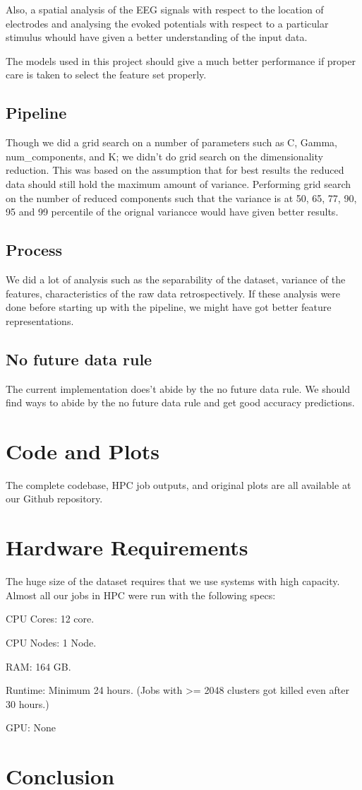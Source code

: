 \documentclass[final,leqno,onefignum,onetabnum]{siamltexmm}
\begin{document}
Also, a spatial analysis of the EEG signals with respect to the location of electrodes and analysing the evoked potentials with respect to a particular stimulus whould have given a better understanding of the input data.

The models used in this project should give a much better performance if proper care is taken to select the feature set properly.

\subsection{Pipeline}
Though we did a grid search on a number of parameters such as C, Gamma, num\_components, and K\@; we didn't do grid search on the dimensionality reduction.  
This was based on the assumption that for best results the reduced data should still hold the maximum amount of variance.
Performing grid search on the number of reduced components such that the variance is at 50, 65, 77, 90, 95 and 99 percentile of the orignal variancce would have given better results.


\subsection{Process}
We did a lot of analysis such as the separability of the dataset, variance of the features, characteristics of the raw data retrospectively.  If these analysis were done before starting up with the pipeline, we might have got better feature representations.

\subsection{No future data rule}
The current implementation does't abide by the no future data rule.  We should find ways to abide by the no future data rule and get good accuracy predictions.


\section{Code and Plots}
The complete codebase, HPC job outputs, and original plots are all available at our Github repository.\cite{repo:github}

\section{Hardware Requirements}
The huge size of the dataset requires that we use systems with high capacity.  Almost all our jobs in HPC were run with the following specs:
\begin{description}
  \item{CPU Cores:}  12 core.
  \item{CPU Nodes:}  1 Node.
  \item{RAM:}  164 GB\@.
  \item{Runtime:} Minimum 24 hours.  (Jobs with >= 2048 clusters got killed even after 30 hours.)
  \item{GPU:} None
\end{description}

\section{Conclusion}

\newpage



\end{document}
